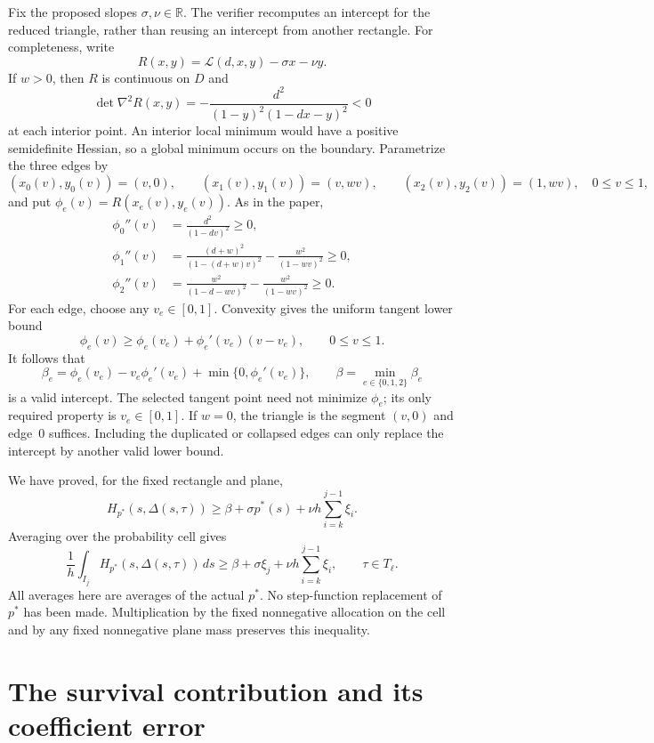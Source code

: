 \documentclass[11pt,a4paper]{article}
\begin{document}
Fix the proposed slopes $\sigma,\nu\in\mathbb R$.  The verifier
recomputes an intercept for the reduced triangle, rather than
reusing an intercept from another rectangle.  For completeness,
write
\[
 R(x,y)=\mathcal L(d,x,y)-\sigma x-\nu y.
\]
If $w>0$, then $R$ is continuous on $D$ and
\[
 \det\nabla^2R(x,y)
 =-\frac{d^2}{(1-y)^2(1-dx-y)^2}<0
\]
at each interior point.  An interior local minimum would have a
positive semidefinite Hessian, so a global minimum occurs on the
boundary.  Parametrize the three edges by
\[
 (x_0(v),y_0(v))=(v,0),\qquad
 (x_1(v),y_1(v))=(v,wv),\qquad
 (x_2(v),y_2(v))=(1,wv),\quad 0\le v\le1,
\]
and put $\phi_e(v)=R(x_e(v),y_e(v))$.  As in the paper,
\[
\begin{aligned}
 \phi_0''(v)&=\frac{d^2}{(1-dv)^2}\ge0,\\
 \phi_1''(v)&=\frac{(d+w)^2}{(1-(d+w)v)^2}
              -\frac{w^2}{(1-wv)^2}\ge0,\\
 \phi_2''(v)&=\frac{w^2}{(1-d-wv)^2}
              -\frac{w^2}{(1-wv)^2}\ge0.
\end{aligned}
\]
For each edge, choose any $v_e\in[0,1]$.  Convexity gives the
uniform tangent lower bound
\[
 \phi_e(v)\ge\phi_e(v_e)+\phi_e'(v_e)(v-v_e),
 \qquad 0\le v\le1.
\]
It follows that
\[
 \beta_e=\phi_e(v_e)-v_e\phi_e'(v_e)
              +\min\{0,\phi_e'(v_e)\},
 \qquad
 \beta=\min_{e\in\{0,1,2\}}\beta_e
\]
is a valid intercept.  The selected tangent point need not minimize
$\phi_e$; its only required property is $v_e\in[0,1]$.
If $w=0$, the triangle is the segment $(v,0)$ and edge~0 suffices.
Including the duplicated or collapsed edges can only replace the
intercept by another valid lower bound.

We have proved, for the fixed rectangle and plane,
\[
 H_{p^*}(s,\Delta(s,\tau))
 \ge\beta+\sigma p^*(s)
          +\nu h\sum_{i=k}^{j-1}\xi_i.
\]
Averaging over the probability cell gives
\[
 \frac1h\int_{I_j}H_{p^*}(s,\Delta(s,\tau))\,ds
 \ge\beta+\sigma\xi_j
          +\nu h\sum_{i=k}^{j-1}\xi_i,
 \qquad \tau\in T_\ell.
\]
All averages here are averages of the actual $p^*$.  No step-function
replacement of $p^*$ has been made.  Multiplication by the fixed
nonnegative allocation on the cell and by any fixed nonnegative
plane mass preserves this inequality.

\section{The survival contribution and its coefficient error}
\label{sec:release-survival}
\end{document}
